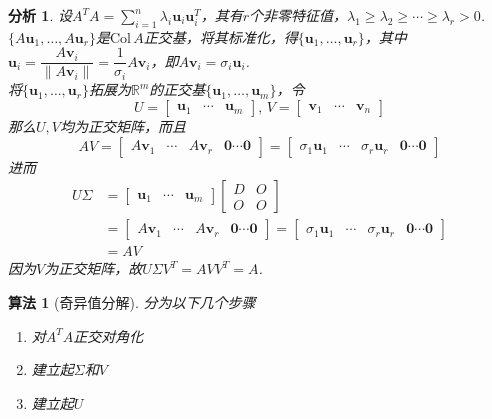 \documentclass[11pt,UTF8]{ctexart}
\newtheorem{algorithm}{算法}
\newtheorem*{analysis}{分析}
\def\vv{\mathbf{v}}
\def\vu{\mathbf{u}}
\def\dis{\displaystyle}
\def\col{\mathrm{Col}\,}
\newcommand{\vb}[1]{\mathbf{#1}}
\begin{document}
\begin{analysis}
设$\dis A^TA=\sum_{i=1}^n\lambda_i\vu_i\vu_i^T$，其有$r$个非零特征值，$\lambda_1\geq\lambda_2\geq\cdots\geq\lambda_r>0$.\\
$\{A\vu_1,\dots,A\vu_r\}$是$\col A$正交基，将其标准化，得$\{\vu_1,\dots,\vu_r\}$，其中$\vu_i=\dfrac{A\vv_i}{\|A\vv_i\|}=\dfrac{1}{\sigma_i}A\vv_i$，即$A\vv_i=\sigma_i\vu_i$.\\
将$\{\vu_1,\dots,\vu_r\}$拓展为$\mathbb{R}^m$的正交基$\{\vu_1,\dots,\vu_m\}$，令
\[U=\begin{bmatrix}\vu_1&\cdots&\vu_m\end{bmatrix},\,V=\begin{bmatrix}\vv_1&\cdots&\vv_n\end{bmatrix}\]
那么$U,V$均为正交矩阵，而且
\[AV=\begin{bmatrix}A\vv_1&\cdots&A\vv_r&\vb{0}\cdots\vb{0}\end{bmatrix}=\begin{bmatrix}\sigma_1\vu_1&\cdots&\sigma_r\vu_r&\vb{0}\cdots\vb{0}\end{bmatrix}\]
进而
\[\begin{aligned}U\Sigma&=\begin{bmatrix}\vu_1&\cdots&\vu_m\end{bmatrix}\begin{bmatrix}D&O\\O&O\end{bmatrix}\\
&=\begin{bmatrix}A\vv_1&\cdots&A\vv_r&\vb{0}\cdots\vb{0}\end{bmatrix}=\begin{bmatrix}\sigma_1\vu_1&\cdots&\sigma_r\vu_r&\vb{0}\cdots\vb{0}\end{bmatrix}\\
&=AV\end{aligned}\]
因为$V$为正交矩阵，故$U\Sigma V^T=AVV^T=A$.
\end{analysis}
\begin{algorithm}[奇异值分解]
分为以下几个步骤
\begin{enumerate}
	\itemsep -3pt
	\item 对$A^TA$正交对角化
	\item 建立起$\Sigma$和$V$
	\item 建立起$U$
\end{enumerate}
\end{algorithm}
\end{document}
